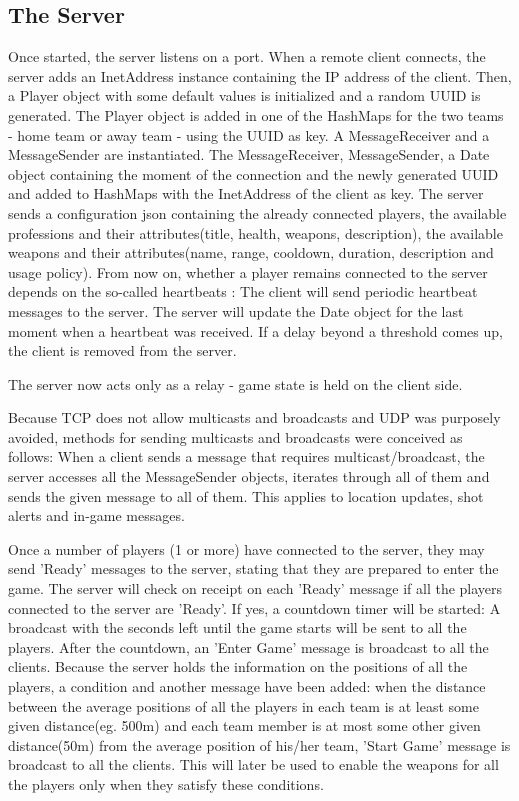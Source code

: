 \documentclass{article}
\begin{document}
\subsection{The Server}

Once started, the server listens on a port. When a remote client connects, the
server adds an InetAddress instance containing the IP address of the client.
Then, a Player object with some default values is initialized and a random UUID
is generated. The Player object is added in one of the HashMaps for the two
teams - home team or away team - using the UUID as key. A MessageReceiver and a
MessageSender are instantiated. The MessageReceiver, MessageSender, a Date
object containing the moment of the connection and the newly generated UUID and
added to HashMaps with the InetAddress of the client as key. The server sends a
configuration json containing the already connected players, the available
professions and their attributes(title, health, weapons, description), the
available weapons and their attributes(name, range, cooldown, duration,
description and usage policy). From now on, whether a player remains connected
to the server depends on the so-called heartbeats : The client will send
periodic heartbeat messages to the server. The server will update the Date
object for the last moment when a heartbeat was received. If a delay beyond a
threshold comes up, the client is removed from the server.\newline

The server now acts only as a relay - game state is held on the client
side.\newline

Because TCP does not allow multicasts and broadcasts and UDP was purposely
avoided, methods for sending multicasts and broadcasts were conceived as
follows: When a client sends a message that requires multicast/broadcast, the
server accesses all the MessageSender objects, iterates through all of them and
sends the given message to all of them. This applies to location updates, shot
alerts and in-game messages.\newline

Once a number of players (1 or more) have connected to the server, they may send
'Ready' messages to the server, stating that they are prepared to enter the
game. The server will check on receipt on each 'Ready' message if all the
players connected to the server are 'Ready'. If yes, a countdown timer will be
started: A broadcast with the seconds left until the game starts will be sent to
all the players. After the countdown, an 'Enter Game' message is broadcast to
all the clients. Because the server holds the information on the positions of
all the players, a condition and another message have been added: when the
distance between the average positions of all the players in each team is at
least some given distance(eg. 500m) and each team member is at most some other
given distance(50m) from the average position of his/her team, 'Start Game'
message is broadcast to all the clients. This will later be used to enable the
weapons for all the players only when they satisfy these conditions.\newline
\end{document}
